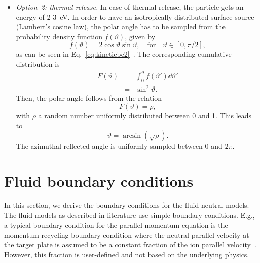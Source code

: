 \begin{itemize}
	\item \emph{Option~2: thermal release.} In case of thermal release, the particle gets an energy of 2-3~eV. In order to have an isotropically distributed surface source (Lambert's cosine law), the polar angle has to be sampled from the probability density function $f(\vartheta)$, given by
	\begin{equation}
	f(\vartheta) = 2 \cos \vartheta \sin \vartheta, \quad \text{for} \quad \vartheta \in [0,\pi/2],
	\end{equation}
	as can be seen in Eq.~\eqref{eq:kineticbc2}~\cite{greenwood2002correct}. The corresponding cumulative distribution is
	\begin{eqnarray}
	F(\vartheta) &=& \int_{0}^{\vartheta} f(\vartheta') \dd \vartheta' \nonumber \\
	&=& \sin^{2} \vartheta.
	\end{eqnarray}
\noindent	Then, the polar angle follows from the relation
	\begin{equation}
	F(\vartheta) = \rho,
	\end{equation}
\noindent	with $\rho$ a random number uniformly distributed between 0 and 1. This leads to
	\begin{equation}
	\vartheta = \arcsin(\sqrt{\rho}).
	\end{equation}
\noindent	The azimuthal reflected angle is uniformly sampled between 0 and $2\pi$.
\end{itemize}

\section{Fluid boundary conditions} \label{sec:fluidbc}

In this section, we derive the boundary conditions for the fluid neutral models. The fluid models as described in literature use simple boundary conditions. E.g., a typical boundary condition for the parallel momentum equation is the momentum recycling boundary condition where the neutral parallel velocity at the target plate is assumed to be a constant fraction of the ion parallel velocity~\cite{rensink1998comparison,riemann2004navier}. However, this fraction is user-defined and not based on the underlying physics.

